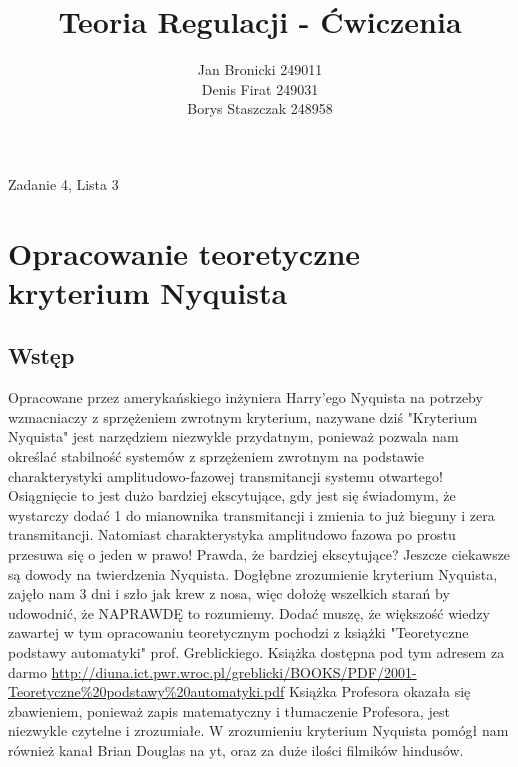 \documentclass{article}
\title{Teoria Regulacji - Ćwiczenia}
\author{Jan Bronicki 249011 \\
        Denis Firat 249031  \\
        Borys Staszczak 248958 }
\date{}
\begin{document}
\maketitle
\begin{center}
    Zadanie 4, Lista 3
\end{center}

\section{Opracowanie teoretyczne kryterium Nyquista}
\subsection{Wstęp}
Opracowane przez amerykańskiego inżyniera Harry'ego Nyquista na potrzeby wzmacniaczy z sprzężeniem zwrotnym kryterium, nazywane dziś "Kryterium Nyquista" jest narzędziem niezwykle przydatnym, ponieważ pozwala nam określać stabilność systemów  z sprzężeniem zwrotnym na podstawie charakterystyki amplitudowo-fazowej transmitancji systemu otwartego! Osiągnięcie to jest dużo bardziej ekscytujące, gdy jest się świadomym, że wystarczy dodać 1 do mianownika transmitancji i zmienia to już bieguny i zera transmitancji. Natomiast charakterystyka amplitudowo fazowa po prostu przesuwa się o jeden w prawo! Prawda, że bardziej ekscytujące? Jeszcze ciekawsze są dowody na twierdzenia Nyquista. Dogłębne zrozumienie kryterium Nyquista, zajęło nam 3 dni i szło jak krew z nosa, więc dołożę wszelkich starań by udowodnić, że NAPRAWDĘ to rozumiemy. Dodać muszę, że większość wiedzy zawartej w tym opracowaniu teoretycznym pochodzi z książki "Teoretyczne podstawy automatyki" prof. Greblickiego. Książka dostępna pod tym adresem za darmo \url{http://diuna.ict.pwr.wroc.pl/greblicki/BOOKS/PDF/2001-Teoretyczne\%20podstawy\%20automatyki.pdf} Książka Profesora okazała się zbawieniem, ponieważ zapis matematyczny i tłumaczenie Profesora, jest niezwykle czytelne i zrozumiałe. W zrozumieniu kryterium Nyquista pomógł nam również kanał Brian Douglas na yt, oraz za duże ilości filmików hindusów.\newpage
\end{document}
